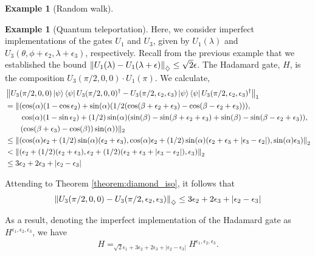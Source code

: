 \documentclass[10pt,a4paper]{amsart}
\theoremstyle{definition}
\theoremstyle{definition}
\newtheorem{example}[definition]{Example}
\theoremstyle{definition}
\theoremstyle{definition}
\theoremstyle{definition}
\theoremstyle{definition}
\begin{document}
\begin{example}[Random walk]
\begin{example}[Quantum teleportation]
    Here, we consider imperfect implementations of the gates $U_1$ and $U_3$, given by $ U_1(\lambda) $ and $ U_3(\theta, \phi + \epsilon_2, \lambda + \epsilon_3)$, respectively. 
    Recall from the previous example that we established the bound $\left\lVert U_1(\lambda)- U_1(\lambda + \epsilon)  \right\rVert_{\diamondsuit} \leq \sqrt{2} \epsilon$.
     The Hadamard gate, $H$, is the composition $U_3(\pi/2, 0, 0)\cdot U_1(\pi)$. We calculate,
    \begin{align*}
      &\left\lVert U_3(\pi/2, 0, 0) \ket{\psi}\bra{\psi}U_3(\pi/2, 0, 0)^\dag - U_3(\pi/2, \epsilon_2, \epsilon_3)  \ket{\psi}\bra{\psi}U_3(\pi/2, \epsilon_2, \epsilon_3)^\dag \right\rVert_{1} \\
      & = \lVert (\cos(\alpha)( 1-\cos{\epsilon_2}) + \sin(\alpha)( 1/2(\cos(\beta + \epsilon_2 + \epsilon_3)-\cos(\beta - \epsilon_2 + \epsilon_3))), \\
      & \hspace{20pt} \cos(\alpha)( 1-\sin{\epsilon_2}) + (1/2)\sin(\alpha) (\sin(\beta)-\sin(\beta+\epsilon_2 + \epsilon_3) + \sin(\beta)-\sin(\beta-\epsilon_2 + \epsilon_3)),   \\
      & \hspace{20pt} (\cos(\beta + \epsilon_3)-\cos(\beta))\sin(\alpha) ) \lVert_2 \\
      & \leq \left\lVert (\cos(\alpha) \epsilon_2 + (1/2)\sin(\alpha) (\epsilon_2 + \epsilon_3) ,\cos(\alpha) \epsilon_2 + (1/2)  \sin(\alpha) (\epsilon_2 + \epsilon_3 + |\epsilon_3-\epsilon_2|), \sin(\alpha) \epsilon_3) \right\rVert_{2} \\
      &  < \left\lVert (\epsilon_2 + (1/2)(\epsilon_2 + \epsilon_3), \epsilon_2 + (1/2)   (\epsilon_2 + \epsilon_3 + |\epsilon_3-\epsilon_2|), \epsilon_3) \right\rVert_{2}  \\
      & \leq 3 \epsilon_2 +  2\epsilon_3 + |\epsilon_2-\epsilon_3| \\
    \end{align*}

    Attending to Theorem \ref{theorem:diamond_iso}, it follows that
    \begin{align*}
      \left\lVert U_3(\pi/2, 0, 0)- U_3(\pi/2, \epsilon_2, \epsilon_3)  \right\rVert_{\diamondsuit} \leq 3 \epsilon_2 +  2\epsilon_3 + |\epsilon_2-\epsilon_3|
    \end{align*}
    
    As a result, denoting the imperfect implementation of the Hadamard gate as $H^{\epsilon_1 ,\epsilon_2, \epsilon_3}$, we have 
    \begin{align} \label{eq:h_error_telepor}
      H =_{ \sqrt{2}\epsilon_1 + 3 \epsilon_2 + 2\epsilon_3 + |\epsilon_2-\epsilon_3|} H^{\epsilon_1 ,\epsilon_2, \epsilon_3}.
    \end{align}
 


\end{example}
\end{example}
\end{document}
